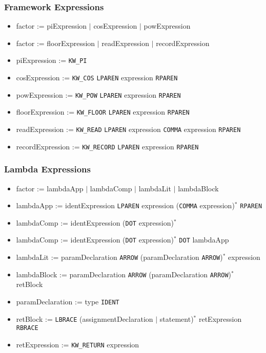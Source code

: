 \subsubsection{Framework Expressions}

\begin{itemize}
	\item factor := piExpression $|$ cosExpression $|$ powExpression
	\item factor := floorExpression $|$ readExpression $|$ recordExpression
	\item piExpression := \texttt{KW\_PI}
	\item cosExpression := \texttt{KW\_COS} \texttt{LPAREN} expression \texttt{RPAREN}
	\item powExpression := \texttt{KW\_POW} \texttt{LPAREN} expression \texttt{RPAREN}
	\item floorExpression := \texttt{KW\_FLOOR} \texttt{LPAREN} expression \texttt{RPAREN}
	\item readExpression := \texttt{KW\_READ} \texttt{LPAREN} expression \texttt{COMMA} expression \texttt{RPAREN}
	\item recordExpression := \texttt{KW\_RECORD} \texttt{LPAREN} expression \texttt{RPAREN}
\end{itemize}

\subsubsection{Lambda Expressions}

\begin{itemize}
	\item factor := lambdaApp $|$ lambdaComp $|$ lambdaLit $|$ lambdaBlock
	\item lambdaApp := identExpression \texttt{LPAREN} expression (\texttt{COMMA} expression)$^*$ \texttt{RPAREN}
	\item lambdaComp := identExpression (\texttt{DOT} expression)$^*$
	\item lambdaComp := identExpression (\texttt{DOT} expression)$^*$ \texttt{DOT} lambdaApp
	\item lambdaLit := paramDeclaration \texttt{ARROW} (paramDeclaration \texttt{ARROW})$^*$ expression
	\item lambdaBlock := paramDeclaration \texttt{ARROW} (paramDeclaration \texttt{ARROW})$^*$ retBlock
	\item paramDeclaration := type \texttt{IDENT}
	\item retBlock := \texttt{LBRACE} (assignmentDeclaration $|$ statement)$^*$ retExpression \texttt{RBRACE}
	\item retExpression := \texttt{KW\_RETURN} expression
\end{itemize}

